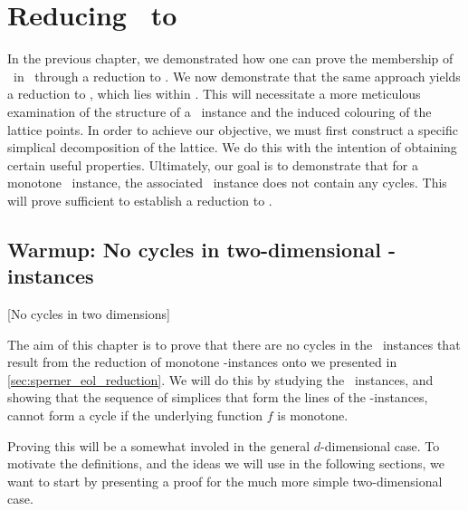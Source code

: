 \setchapterpreamble[u]{\margintoc}
\chapter{Reducing \Tarski\ to \EOPL}

In the previous chapter, we demonstrated how one can prove the membership of \Tarski\ in \PPAD\ through a reduction to \Sperner. We now demonstrate that the same approach yields a reduction to \EndOfPotentialLine, which lies within \EOPL. This will necessitate a more meticulous examination of the structure of a \Tarski\ instance and the induced colouring of the lattice points. In order to achieve our objective, we must first construct a specific simplical decomposition of the lattice. We do this with the intention of obtaining certain useful properties. Ultimately, our goal is to demonstrate that for a monotone \Tarski\ instance, the associated \EndOfLine\ instance does not contain any cycles. This will prove sufficient to establish a reduction to \EndOfPotentialLine.

\section{Warmup: No cycles in two-dimensional \Tarskistar-instances}[No cycles in two dimensions]

The aim of this chapter is to prove that there are no cycles in the \EndOfLine\ instances that result from the reduction of monotone \Tarskistar-instances onto \EndOfLine we presented in \cref{sec:sperner_eol_reduction}. We will do this by studying the \Sperner\ instances, and showing that the sequence of simplices that form the lines of the \EndOfLine-instances, cannot form a cycle if the underlying function $f$ is monotone.

Proving this will be a somewhat involed in the general $d$-dimensional case. To motivate the definitions, and the ideas we will use in the following sections, we want to start by presenting a proof for the much more simple two-dimensional case.

